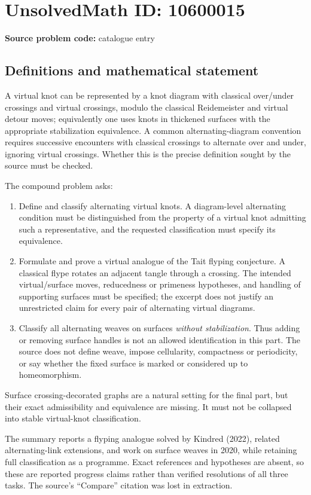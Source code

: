 \documentclass[11pt]{article}
\begin{document}
\section*{UnsolvedMath ID: 10600015}
\textbf{Source problem code:} catalogue entry
\subsection{Definitions and mathematical statement}
A virtual knot can be represented by a knot diagram with classical over/under crossings and virtual crossings, modulo the classical Reidemeister and virtual detour moves; equivalently one uses knots in thickened surfaces with the appropriate stabilization equivalence. A common alternating-diagram convention requires successive encounters with classical crossings to alternate over and under, ignoring virtual crossings. Whether this is the precise definition sought by the source must be checked.

The compound problem asks:
\begin{enumerate}
\item Define and classify alternating virtual knots. A diagram-level alternating condition must be distinguished from the property of a virtual knot admitting such a representative, and the requested classification must specify its equivalence.
\item Formulate and prove a virtual analogue of the Tait flyping conjecture. A classical flype rotates an adjacent tangle through a crossing. The intended virtual/surface moves, reducedness or primeness hypotheses, and handling of supporting surfaces must be specified; the excerpt does not justify an unrestricted claim for every pair of alternating virtual diagrams.
\item Classify all alternating weaves on surfaces \emph{without stabilization}. Thus adding or removing surface handles is not an allowed identification in this part. The source does not define weave, impose cellularity, compactness or periodicity, or say whether the fixed surface is marked or considered up to homeomorphism.
\end{enumerate}
Surface crossing-decorated graphs are a natural setting for the final part, but their exact admissibility and equivalence are missing. It must not be collapsed into stable virtual-knot classification.

The summary reports a flyping analogue solved by Kindred (2022), related alternating-link extensions, and work on surface weaves in 2020, while retaining full classification as a programme. Exact references and hypotheses are absent, so these are reported progress claims rather than verified resolutions of all three tasks. The source's ``Compare'' citation was lost in extraction.
\end{document}
